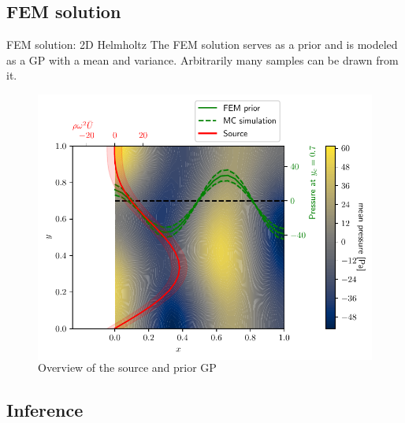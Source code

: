 \documentclass[fleqn,11pt,aspectratio=43]{beamer}
\begin{document}
\subsection{FEM solution}
\begin{frame}{FEM solution: 2D Helmholtz}
The FEM solution serves as a prior and is modeled as a GP with a mean and variance. Arbitrarily many samples can be drawn from it. 
      	\begin{figure}
      	\begin{columns}
      	
		\includegraphics[width=1\textwidth]{SolutionCustom2D.pdf}
		\caption{Overview of the source and prior GP}
		\end{columns}


		\end{figure}


\end{frame}





\subsection{Inference}
\end{document}
